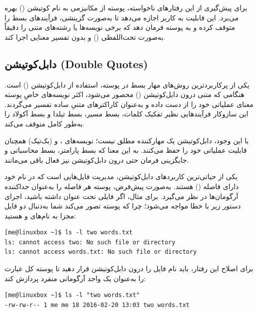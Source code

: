 برای پیش‌گیری از این رفتارهای ناخواسته، پوسته از مکانیزمی به نام کوتیشن () بهره می‌برد. این قابلیت به کاربر اجازه می‌دهد تا به‌صورت گزینشی، فرآیندهای بسط را متوقف کرده و به پوسته فرمان دهد که برخی نویسه‌ها یا رشته‌های متنی را دقیقاً به‌صورت تحت‌اللفظی () و بدون تفسیر معنایی اجرا کند.

\subsection{دابل‌کوتیشن (Double Quotes)}

یکی از پرکاربردترین روش‌های مهار بسط در پوسته، استفاده از دابل‌کوتیشن () است. هنگامی که متنی درون دابل‌کوتیشن () محصور می‌شود، اکثر نویسه‌های خاصِ پوسته معنای عملیاتی خود را از دست داده و به‌عنوان کاراکترهای متنیِ ساده تفسیر می‌گردند. این سازوکار فرآیندهایی نظیر تفکیک کلمات، بسط مسیر، بسط تیلدا و بسط آکولاد را به‌طور کامل متوقف می‌کند.

با این وجود، دابل‌کوتیشن یک مهارکننده مطلق نیست؛ نویسه‌های \cmd{\$}، \cmd{\textbackslash} و  (بک‌تیک) همچنان قابلیت عملیاتی خود را حفظ می‌کنند. به این معنا که بسط پارامتر، بسط محاسباتی و جایگزینی فرمان حتی درون دابل‌کوتیشن نیز فعال باقی می‌مانند.

یکی از حیاتی‌ترین کاربردهای دابل‌کوتیشن، مدیریت فایل‌هایی است که در نام خود دارای فاصله () هستند. به‌صورت پیش‌فرض، پوسته هر فاصله را به‌عنوان جداکننده آرگومان‌ها در نظر می‌گیرد. برای مثال، اگر فایلی تحت عنوان  داشته باشید، اجرای دستور زیر با خطا مواجه می‌شود؛ چرا که پوسته تصور می‌کند شما به‌دنبال دو فایل مجزا به نام‌های  و  هستید:

\begin{latin}
\begin{lstlisting}
[me@linuxbox ~]$ ls -l two words.txt
ls: cannot access two: No such file or directory
ls: cannot access words.txt: No such file or directory
\end{lstlisting}
\end{latin}

برای اصلاح این رفتار، باید نام فایل را درون دابل‌کوتیشن قرار دهید تا پوسته کل عبارت را به‌عنوان یک واحد آرگومانی منفرد پردازش کند:

\begin{latin}
\begin{lstlisting}
[me@linuxbox ~]$ ls -l "two words.txt"
-rw-rw-r-- 1 me me 18 2016-02-20 13:03 two words.txt
\end{lstlisting}
\end{latin}

